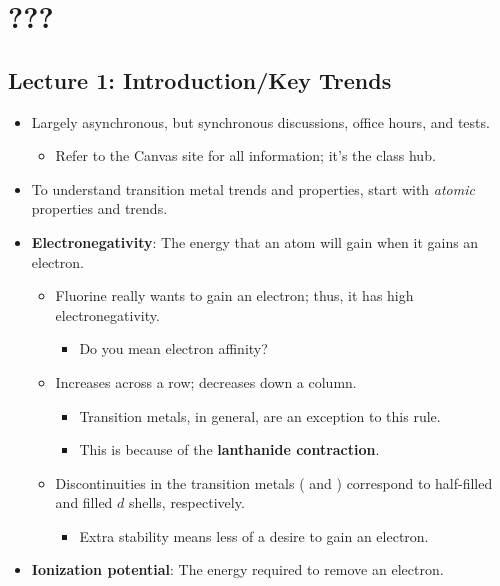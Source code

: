\documentclass[../notes.tex]{subfiles}
\begin{document}
\chapter{???}
\section{Lecture 1: Introduction/Key Trends}
\begin{itemize}
    \item {}Largely asynchronous, but synchronous discussions, office hours, and tests.
    \begin{itemize}
        \item Refer to the Canvas site for all information; it's the class hub.
    \end{itemize}
    \item To understand transition metal trends and properties, start with \emph{atomic} properties and trends.
    \item \textbf{Electronegativity}: The energy that an atom will gain when it gains an electron.
    \begin{itemize}
        \item Fluorine really wants to gain an electron; thus, it has high electronegativity.
        \begin{itemize}
            \item Do you mean electron affinity?
        \end{itemize}
        \item Increases across a row; decreases down a column.
        \begin{itemize}
            \item Transition metals, in general, are an exception to this rule.
            \item This is because of the \textbf{lanthanide contraction}.
        \end{itemize}
        \item Discontinuities in the transition metals ( and ) correspond to half-filled and filled $d$ shells, respectively.
        \begin{itemize}
            \item Extra stability means less of a desire to gain an electron.
        \end{itemize}
    \end{itemize}
    \item \textbf{Ionization potential}: The energy required to remove an electron.
    \begin{itemize}

\end{itemize}
\end{itemize}
\end{document}
